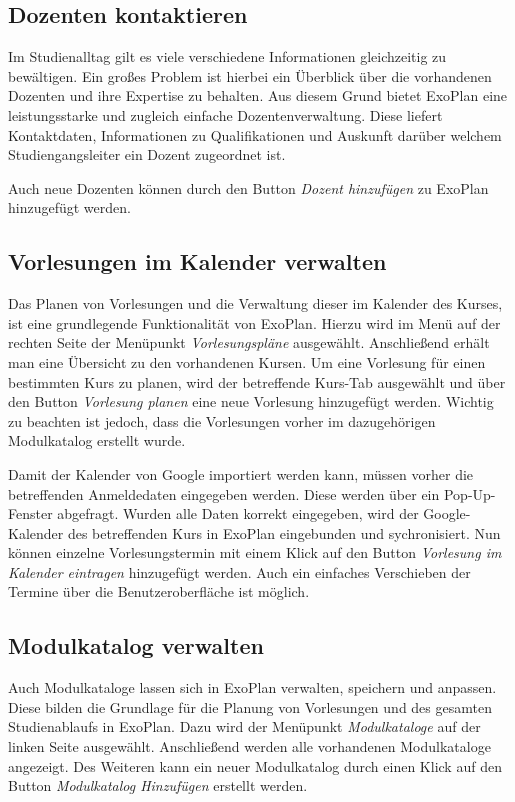 \subsection{Dozenten kontaktieren}

Im Studienalltag gilt es viele verschiedene Informationen gleichzeitig zu bewältigen. Ein großes Problem ist hierbei ein Überblick über die vorhandenen Dozenten und ihre Expertise zu behalten. Aus diesem Grund bietet ExoPlan eine leistungsstarke und zugleich einfache Dozentenverwaltung. Diese liefert Kontaktdaten, Informationen zu Qualifikationen und Auskunft darüber welchem Studiengangsleiter ein Dozent zugeordnet ist.

Auch neue Dozenten können durch den Button \textit{Dozent hinzufügen} zu ExoPlan hinzugefügt werden.
\subsection{Vorlesungen im Kalender verwalten}

Das Planen von Vorlesungen und die Verwaltung dieser im Kalender des Kurses, ist eine grundlegende Funktionalität von ExoPlan. Hierzu wird im Menü auf der rechten Seite der Menüpunkt \textit{Vorlesungspläne} ausgewählt. Anschließend erhält man eine Übersicht zu den vorhandenen Kursen. Um eine Vorlesung für einen bestimmten Kurs zu planen, wird der betreffende Kurs-Tab ausgewählt und über den Button \textit{Vorlesung planen} eine neue Vorlesung hinzugefügt werden. Wichtig zu beachten ist jedoch, dass die Vorlesungen vorher im dazugehörigen Modulkatalog erstellt wurde.

Damit der Kalender von Google importiert werden kann, müssen vorher die betreffenden Anmeldedaten eingegeben werden. Diese werden über ein Pop-Up-Fenster abgefragt. Wurden alle Daten korrekt eingegeben, wird der Google-Kalender des betreffenden Kurs in ExoPlan eingebunden und sychronisiert. Nun können einzelne Vorlesungstermin mit einem Klick auf den Button \textit{Vorlesung im Kalender eintragen} hinzugefügt werden. Auch ein einfaches Verschieben der Termine über die Benutzeroberfläche ist möglich.

\subsection{Modulkatalog verwalten}

Auch Modulkataloge lassen sich in ExoPlan verwalten, speichern und anpassen. Diese bilden die Grundlage für die Planung von Vorlesungen und des gesamten Studienablaufs in ExoPlan. Dazu wird der Menüpunkt \textit{Modulkataloge} auf der linken Seite ausgewählt. Anschließend werden alle vorhandenen Modulkataloge angezeigt. Des Weiteren kann ein neuer Modulkatalog durch einen Klick auf den Button \textit{Modulkatalog Hinzufügen} erstellt werden. 

